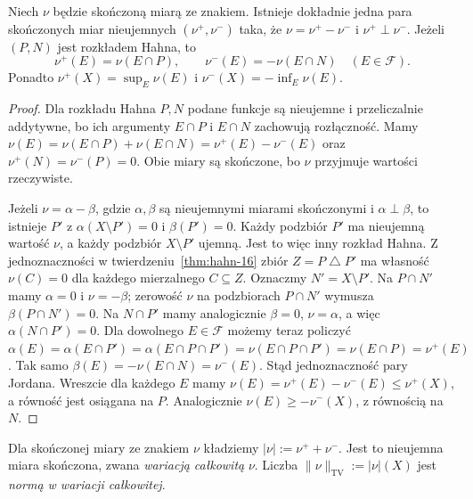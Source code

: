 \begin{twierdzenie}
\label{thm:jordan-16}
Niech $\nu$ będzie skończoną miarą ze znakiem.
Istnieje dokładnie jedna para skończonych miar nieujemnych
$(\nu^+,\nu^-)$ taka, że
$\nu=\nu^+-\nu^-$ i $\nu^+\perp\nu^-$.
Jeżeli $(P,N)$ jest rozkładem Hahna, to
\[
\nu^+(E)=\nu(E\cap P),\qquad
\nu^-(E)=-\nu(E\cap N)\quad(E\in\mathcal F).
\]
Ponadto $\nu^+(X)=\sup_E\nu(E)$ i
$\nu^-(X)=-\inf_E\nu(E)$.
\end{twierdzenie}
\begin{proof}
Dla rozkładu Hahna $P,N$ podane funkcje
są nieujemne i przeliczalnie addytywne, bo ich
argumenty $E\cap P$ i $E\cap N$ zachowują rozłączność.
Mamy $\nu(E)=\nu(E\cap P)+\nu(E\cap N)
=\nu^+(E)-\nu^-(E)$ oraz
$\nu^+(N)=\nu^-(P)=0$. Obie miary są skończone,
bo $\nu$ przyjmuje wartości rzeczywiste.

Jeżeli $\nu=\alpha-\beta$, gdzie $\alpha,\beta$ są
nieujemnymi miarami skończonymi i $\alpha\perp\beta$,
to istnieje $P'$ z $\alpha(X\setminus P')=0$
i $\beta(P')=0$. Każdy podzbiór $P'$ ma nieujemną
wartość $\nu$, a każdy podzbiór $X\setminus P'$ ujemną.
Jest to więc inny rozkład Hahna. Z jednoznaczności
w twierdzeniu~\ref{thm:hahn-16} zbiór
$Z=P\mathbin\triangle P'$ ma własność $\nu(C)=0$
dla każdego mierzalnego $C\subseteq Z$.
Oznaczmy $N'=X\setminus P'$. Na $P\cap N'$ mamy $\alpha=0$ i $\nu=-\beta$;
zerowość $\nu$ na podzbiorach $P\cap N'$ wymusza
$\beta(P\cap N')=0$. Na $N\cap P'$ mamy analogicznie
$\beta=0$, $\nu=\alpha$, a więc
$\alpha(N\cap P')=0$. Dla dowolnego $E\in\mathcal F$
możemy teraz policzyć
$\alpha(E)=\alpha(E\cap P')=\alpha(E\cap P\cap P')
=\nu(E\cap P\cap P')=\nu(E\cap P)=\nu^+(E)$.
Tak samo $\beta(E)=-\nu(E\cap N)=\nu^-(E)$.
Stąd jednoznaczność pary Jordana.
Wreszcie dla każdego $E$ mamy
$\nu(E)=\nu^+(E)-\nu^-(E)\le\nu^+(X)$,
a równość jest osiągana na $P$. Analogicznie
$\nu(E)\ge-\nu^-(X)$, z równością na $N$.
\end{proof}

\begin{definicja}
\label{def:variation-signed-16}
Dla skończonej miary ze znakiem $\nu$ kładziemy
$|\nu|:=\nu^++\nu^-$. Jest to nieujemna miara
skończona, zwana \emph{wariacją całkowitą} $\nu$.
Liczba $\|\nu\|_{\mathrm{TV}}:=|\nu|(X)$ jest
\emph{normą w wariacji całkowitej}.
\end{definicja}

